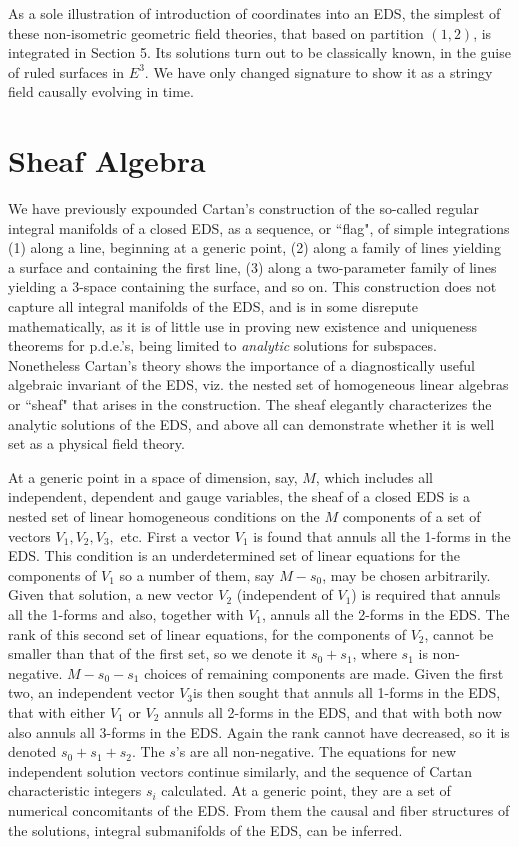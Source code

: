 \documentclass[a4paper,a4paper]{article}
\begin{document}
        As a sole illustration of introduction of coordinates into an
EDS,  the simplest of these non-isometric geometric field theories,
that  based on partition $(1, 2)$,  is integrated in Section 5.  Its solutions turn out
to be classically known,  in the guise of ruled surfaces in ${E^3}$.  We
have only changed signature to show it as a stringy field causally evolving
in time.

\section{Sheaf Algebra}

        We have previously expounded \cite{est89} Cartan's construction
of the so-called regular integral manifolds of a closed EDS,  as a
sequence,  or ``flag",  of simple  integrations (1) along a line,  beginning at a generic point,
(2) along a family of lines yielding a surface and containing the first
line, (3) along a two-parameter family of lines yielding a 3-space containing
the surface,  and so on.  This construction does not capture all
integral manifolds of the EDS,  and is in some disrepute mathematically,  as it
is of little use in proving new existence and uniqueness theorems for
p.d.e.'s, being limited to {\itshape analytic} solutions for subspaces.
Nonetheless Cartan's  theory shows the importance of a diagnostically
useful algebraic invariant of the EDS,  viz. the nested set of homogeneous linear
algebras or ``sheaf" that arises in the construction.  The sheaf
elegantly characterizes the analytic solutions of the EDS,  and above all can demonstrate
whether it is well set as a physical field theory.

        At a generic point in a space of dimension,  say,  $M$,  which
includes all independent,  dependent and gauge variables,   the sheaf of
a closed EDS is a nested set of linear homogeneous conditions on the $M$ components of a
set of  vectors ${V_1},  {V_2},  {V_3}, $ etc.  First a vector ${V_1}$
is found that annuls all the 1-forms in the EDS.  This condition is an
underdetermined set of linear equations for the components of ${V_1}$ so
a number of them,  say $M-{s_0}$,  may be chosen arbitrarily.  Given
that solution,  a new vector ${V_2}$ (independent of ${V_1}$) is
required that annuls all the 1-forms and also,  together with ${V_1}$,
annuls all the 2-forms in the EDS.  The rank of this second set of
linear equations,  for the components of ${V_2}$,  cannot be smaller than that
of the first set,  so we denote it ${s_0} + {s_1}$,
where ${s_1}$ is non-negative.  $M-{s_0} - {s_1}$ choices of remaining
components are made. Given the first two,  an independent vector
\({V_3}\)is then sought that annuls all 1-forms in the EDS,  that with either
${V_1}$ or ${V_2}$ annuls all 2-forms in the EDS,  and that with both
now also annuls all 3-forms in the EDS.  Again the rank cannot have
decreased,  so it is denoted ${s_0} + {s_1} + {s_2}$.  The $s$'s
are all non-negative.  The equations for new independent solution
vectors continue similarly,  and the sequence of Cartan characteristic
integers \({s_i}\) calculated.  At a generic point,  they are a set of numerical
concomitants of the EDS.  From them the causal and fiber structures of
the solutions,  integral submanifolds of the EDS,  can be inferred.
\end{document}
